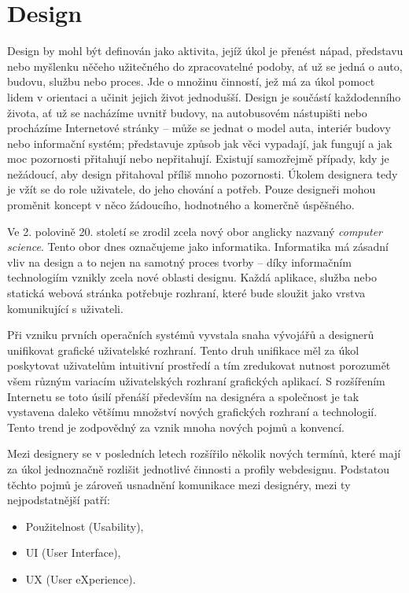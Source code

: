 \chapter{Design}
\label{chap:design}

Design by mohl být definován jako aktivita, jejíž úkol je přenést nápad, představu nebo myšlenku něčeho užitečného do zpracovatelné podoby, ať už se jedná o auto, budovu, službu nebo proces. Jde o množinu činností, jež má za úkol pomoct lidem v orientaci a učinit jejich život jednodušší. Design je součástí každodenního života, ať už se nacházíme uvnitř budovy, na autobusovém nástupišti nebo procházíme Internetové stránky -- může se jednat o model auta, interiér budovy nebo informační systém; představuje způsob jak věci vypadají, jak fungují a jak moc pozornosti přitahují nebo nepřitahují. Existují samozřejmě případy, kdy je nežádoucí, aby design přitahoval příliš mnoho pozornosti. Úkolem designera tedy je vžít se do role uživatele, do jeho chování a potřeb. Pouze designeři mohou proměnit koncept v něco žádoucího, hodnotného a komerčně úspěšného. \cite{8}

Ve 2. polovině 20. století se zrodil zcela nový obor anglicky nazvaný \textit{computer science}. Tento obor dnes označujeme jako informatika. Informatika má zásadní vliv na design a to nejen na samotný proces tvorby -- díky informačním technologiím vznikly zcela nové oblasti designu. Každá aplikace, služba nebo statická webová stránka potřebuje rozhraní, které bude sloužit jako vrstva komunikující s uživateli.

Při vzniku prvních operačních systémů vyvstala snaha vývojářů a designerů unifikovat grafické uživatelské rozhraní. Tento druh unifikace měl za úkol poskytovat uživatelům intuitivní prostředí a tím zredukovat nutnost porozumět všem různým variacím uživatelských rozhraní grafických aplikací. S rozšířením Internetu se toto úsilí přenáší především na designéra a společnost je tak vystavena daleko většímu množství nových grafických rozhraní a technologií. Tento trend je zodpovědný za vznik mnoha nových pojmů a konvencí.

Mezi designery se v posledních letech rozšířilo několik nových termínů, které mají za úkol jednoznačně rozlišit jednotlivé činnosti a profily webdesignu. Podstatou těchto pojmů je zároveň usnadnění komunikace mezi designéry, mezi ty nejpodstatnější patří:

\begin{itemize}
    \item Použitelnost (Usability),
    \item UI (User Interface),
    \item UX (User eXperience).
\end{itemize}

